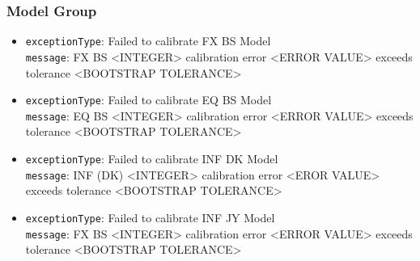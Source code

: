 \subsubsection*{Model Group}

\begin{itemize}

  \item \lstinline!exceptionType!: Failed to calibrate FX BS Model \\
        \lstinline!message!: FX BS <INTEGER> calibration error <ERROR VALUE> exceeds tolerance <BOOTSTRAP TOLERANCE>


  \item \lstinline!exceptionType!: Failed to calibrate EQ BS Model \\
        \lstinline!message!: EQ BS <INTEGER> calibration error <ERROR VALUE> exceeds tolerance <BOOTSTRAP TOLERANCE>



  \item \lstinline!exceptionType!: Failed to calibrate INF DK Model \\
        \lstinline!message!: INF (DK) <INTEGER> calibration error <EROR VALUE> exceeds tolerance <BOOTSTRAP TOLERANCE>


  \item \lstinline!exceptionType!: Failed to calibrate INF JY Model \\
        \lstinline!message!: FX BS <INTEGER> calibration error <ERROR VALUE> exceeds tolerance <BOOTSTRAP TOLERANCE>


\end{itemize}
